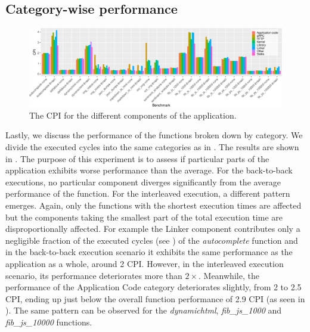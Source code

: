 \subsection{Category-wise performance}
\label{wosc:subsec:cat-perf}

\begin{figure}
  \centering
  \includegraphics[width=\textwidth]{figures/cat-cpi.pdf}
  \caption{\label{wosc:fig:cat-cpi} The CPI for the different components of the application.}
\end{figure}

Lastly, we discuss the performance of the functions broken down by category. We divide the executed cycles into the same categories as in . The results are shown in . The purpose of this experiment is to assess if particular parts of the application exhibits worse performance than the average. For the back-to-back executions, no particular component diverges significantly from the average performance of the function. For the interleaved execution, a different pattern emerges. Again, only the functions with the shortest execution times are affected but the components taking the smallest part of the total execution time are disproportionally affected. For example the Linker component contributes only a negligible fraction of the executed cycles (see ) of the \emph{autocomplete} function and in the back-to-back execution scenario it exhibits the same performance as the application as a whole, around 2 CPI. However, in the interleaved execution scenario, its performance deteriorates more than $2 \times$.
Meanwhile, the performance of the Application Code category deteriorates slightly, from 2 to 2.5 CPI, ending up just below the overall function performance of 2.9 CPI (as seen in ). The same pattern can be observed for the \emph{dynamichtml}, \emph{fib\_js\_1000} and \emph{fib\_js\_10000}
functions.


